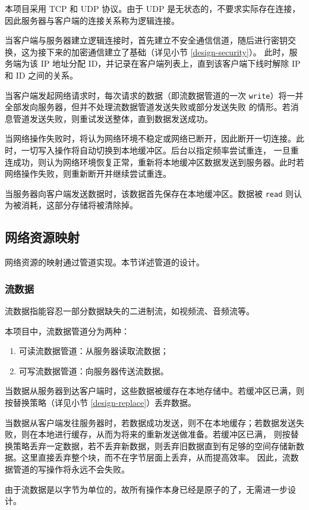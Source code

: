 \documentclass{ctexart}
\begin{document}
本项目采用 TCP 和 UDP 协议。由于 UDP 是无状态的，不要求实际存在连接，因此服务器与客户端的连接关系称为逻辑连接。

当客户端与服务器建立逻辑连接时，首先建立不安全通信信道，随后进行密钥交换，这为接下来的加密通信建立了基础（详见小节 \ref{design-security}）。
此时，服务端为该 IP 地址分配 ID，并记录在客户端列表上，直到该客户端下线时解除 IP 和 ID 之间的关系。

当客户端发起网络请求时，每次请求的数据（即流数据管道的一次 \verb|write|）将一并全部发向服务器，但并不处理流数据管道发送失败或部分发送失败
的情形。若消息管道发送失败，则重试发送整体，直到数据发送成功。

当网络操作失败时，将认为网络环境不稳定或网络已断开，因此断开一切连接。此时，一切写入操作将自动切换到本地缓冲区。后台以指定频率尝试重连，
一旦重连成功，则认为网络环境恢复正常，重新将本地缓冲区数据发送到服务器。此时若网络操作失败，则重新断开并继续尝试重连。

当服务器向客户端发送数据时，该数据首先保存在本地缓冲区。数据被 \verb|read| 则认为被消耗，这部分存储将被清除掉。

\subsection{网络资源映射}
网络资源的映射通过管道实现。本节详述管道的设计。

\subsubsection{流数据}
\label{design-stream}
流数据指能容忍一部分数据缺失的二进制流，如视频流、音频流等。

本项目中，流数据管道分为两种：
\begin{enumerate}
	\item 可读流数据管道：从服务器读取流数据；
	\item 可写流数据管道：向服务器传送流数据。
\end{enumerate}

当数据从服务器到达客户端时，这些数据被缓存在本地存储中。若缓冲区已满，则按替换策略（详见小节 \ref{design-replace}）丢弃数据。

当数据从客户端发往服务器时，若数据成功发送，则不在本地缓存；若数据发送失败，则在本地进行缓存，从而为将来的重新发送做准备。若缓冲区已满，
则按替换策略丢弃一定数据，若不丢弃新数据，则丢弃旧数据直到有足够的空间存储新数据。这里直接丢弃整个块，而不在字节层面上丢弃，从而提高效率。
因此，流数据管道的写操作将永远不会失败。

由于流数据是以字节为单位的，故所有操作本身已经是原子的了，无需进一步设计。
\end{document}
